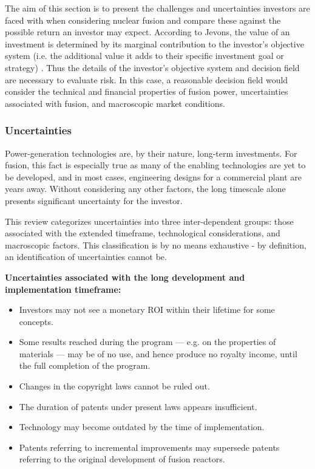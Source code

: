 The aim of this section is to present the challenges and uncertainties investors are faced with when considering nuclear fusion and compare these against the possible return an investor may expect. According to Jevons,  the value of an investment is determined by its marginal contribution to the investor’s objective system (i.e. the additional value it adds to their specific investment goal or strategy) \cite{jevons1879theory}. Thus the details of the investor’s objective system and decision field are necessary to evaluate risk. In this case, a reasonable decision field would consider the technical and financial properties of fusion power, uncertainties associated with fusion, and macroscopic market conditions. 

\subsubsection{Uncertainties}

Power-generation technologies are, by their nature, long-term investments. For fusion, this fact is especially true as many of the enabling technologies are yet to be developed, and in most cases, engineering designs for a commercial plant are years away. Without considering any other factors, the long timescale alone presents significant uncertainty for the investor. 

This review categorizes uncertainties into three inter-dependent groups: those associated with the extended timeframe, technological considerations, and macroscopic factors. This classification is by no means exhaustive - by definition, an identification of uncertainties cannot be.

\textbf{Uncertainties associated with the long development and implementation timeframe:}
\begin{itemize}
\item Investors may not see a monetary ROI within their lifetime for some concepts.
 \item Some results reached during the program — e.g. on the properties of materials — may be of no use, and hence produce no royalty income, until the full completion of the program.
 \item Changes in the copyright laws cannot be ruled out.
 \item The duration of patents under present laws appears insufficient.
 \item Technology may become outdated by the time of implementation.
 \item Patents referring to incremental improvements may supersede patents referring to the original development of fusion reactors.
\end{itemize}


